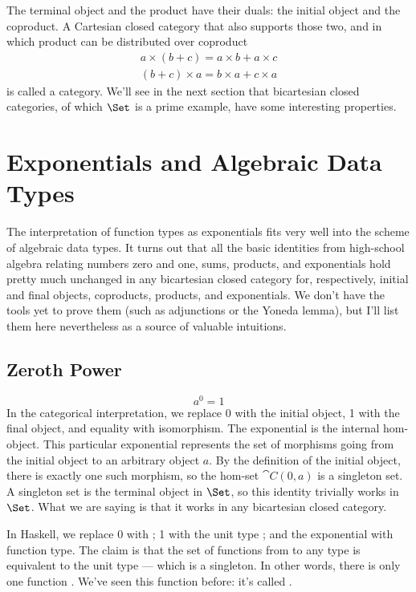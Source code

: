 The terminal object and the product have their duals: the initial object
and the coproduct. A Cartesian closed category that also supports those
two, and in which product can be distributed over coproduct
\begin{gather*}
  a \times (b + c) = a \times b + a \times c \\
  (b + c) \times a = b \times a + c \times a
\end{gather*}
is called a  category. We'll see in the next
section that bicartesian closed categories, of which $\Set$ is a
prime example, have some interesting properties.

\section{Exponentials and Algebraic Data Types}

The interpretation of function types as exponentials fits very well into
the scheme of algebraic data types. It turns out that all the basic
identities from high-school algebra relating numbers zero and one, sums,
products, and exponentials hold pretty much unchanged in any bicartesian
closed category for, respectively, initial and final objects,
coproducts, products, and exponentials. We don't have the tools yet to
prove them (such as adjunctions or the Yoneda lemma), but I'll list them
here nevertheless as a source of valuable intuitions.

\subsection{Zeroth Power}

\[a^{0} = 1\]
In the categorical interpretation, we replace 0 with the initial object,
1 with the final object, and equality with isomorphism. The exponential
is the internal hom-object. This particular exponential represents the
set of morphisms going from the initial object to an arbitrary object
$a$. By the definition of the initial object, there is exactly
one such morphism, so the hom-set $\cat{C}(0, a)$ is a singleton set. A
singleton set is the terminal object in $\Set$, so this identity
trivially works in $\Set$. What we are saying is that it works in
any bicartesian closed category.

In Haskell, we replace 0 with ; 1 with the unit type
\code{()}; and the exponential with function type. The claim is that
the set of functions from  to any type  is
equivalent to the unit type --- which is a singleton. In other words,
there is only one function . We've seen
this function before: it's called .


